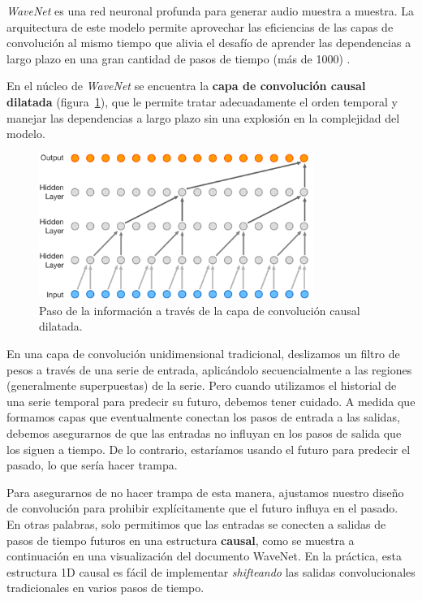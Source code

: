 \documentclass[a4paper,12pt]{article}
\begin{document}
\textit{WaveNet} es una red neuronal profunda para generar audio muestra a muestra. La arquitectura de este modelo permite aprovechar las eficiencias de las capas de convolución al mismo tiempo que alivia el desafío de aprender las dependencias a largo plazo en una gran cantidad de pasos de tiempo (más de 1000) \citep{wavenet2}.

En el núcleo de \textit{WaveNet} se encuentra la \textbf{capa de convolución causal dilatada} (figura~\ref{fig:causal-conv}), que le permite tratar adecuadamente el orden temporal y manejar las dependencias a largo plazo sin una explosión en la complejidad del modelo. \citep{wavenet}

\begin{figure}[H]
	\begin{center}				
	\includegraphics[width=0.8\textwidth]{causal-conv.png}
  	\caption{Paso de la información a través de la capa de convolución causal dilatada.}
  	\label{fig:causal-conv}
  	\end{center}
\end{figure}

En una capa de convolución unidimensional tradicional, deslizamos un filtro de pesos a través de una serie de entrada, aplicándolo secuencialmente a las regiones (generalmente superpuestas) de la serie. Pero cuando utilizamos el historial de una serie temporal para predecir su futuro, debemos tener cuidado. A medida que formamos capas que eventualmente conectan los pasos de entrada a las salidas, debemos asegurarnos de que las entradas no influyan en los pasos de salida que los siguen a tiempo. De lo contrario, estaríamos usando el futuro para predecir el pasado, lo que sería hacer trampa.

Para asegurarnos de no hacer trampa de esta manera, ajustamos nuestro diseño de convolución para prohibir explícitamente que el futuro influya en el pasado. En otras palabras, solo permitimos que las entradas se conecten a salidas de pasos de tiempo futuros en una estructura \textbf{causal}, como se muestra a continuación en una visualización del documento WaveNet. En la práctica, esta estructura 1D causal es fácil de implementar \textit{shifteando} las salidas convolucionales tradicionales en varios pasos de tiempo.
\end{document}
